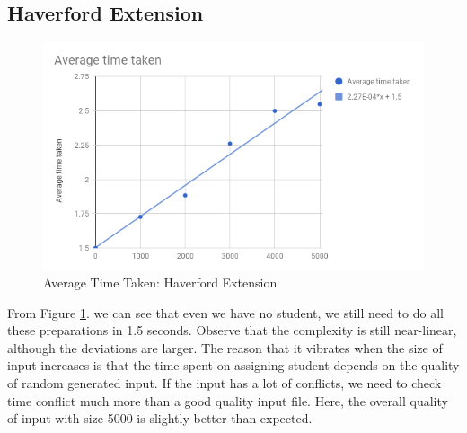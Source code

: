 \documentclass[11pt, oneside]{article}   	%
\begin{document}
\subsection{ Haverford Extension}
\begin{figure}[H]
\centering
\includegraphics[scale =.6]{chart}
\caption{Average Time Taken: Haverford Extension}
\label{timechart-2}
\end{figure}
From Figure \ref{timechart-2}. we can see that even we have no student, we still need to do all these preparations in 1.5 seconds. Observe that the complexity is still near-linear, although the deviations are larger. The reason that it vibrates when the size of input increases is that the time spent on assigning student depends on the quality of random generated input. If the input has a lot of conflicts, we need to check time conflict much more than a good quality input file. Here, the overall quality of input with size 5000 is slightly better than expected. 
\end{document}
